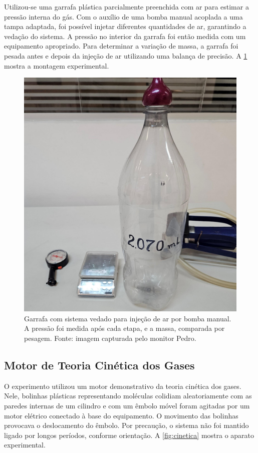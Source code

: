 Utilizou-se uma garrafa plástica parcialmente preenchida com ar para estimar a pressão interna do gás. Com o auxílio de uma bomba manual acoplada a uma tampa adaptada, foi possível injetar diferentes quantidades de ar, garantindo a vedação do sistema. A pressão no interior da garrafa foi então medida com um equipamento apropriado. Para determinar a variação de massa, a garrafa foi pesada antes e depois da injeção de ar utilizando uma balança de precisão. A \cref{fig:garrafa} mostra a montagem experimental.

\begin{figure}[H]
\centering
\includegraphics[width=0.40\linewidth]{fig/garrafa.png}
\caption{Garrafa com sistema vedado para injeção de ar por bomba manual. A pressão foi medida após cada etapa, e a massa, comparada por pesagem. Fonte: imagem capturada pelo monitor Pedro.}
\label{fig:garrafa}
\end{figure}

\subsection{Motor de Teoria Cinética dos Gases}

O experimento utilizou um motor demonstrativo da teoria cinética dos gases. Nele, bolinhas plásticas representando moléculas colidiam aleatoriamente com as paredes internas de um cilindro e com um êmbolo móvel foram agitadas por um motor elétrico conectado à base do equipamento. O movimento das bolinhas provocava o deslocamento do êmbolo. Por precaução, o sistema não foi mantido ligado por longos períodos, conforme orientação. A \cref{fig:cinetica} mostra o aparato experimental.

